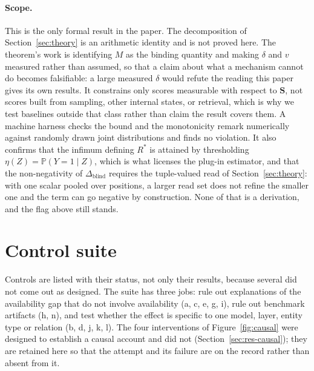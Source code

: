 \documentclass{article}
\newcommand{\gate}{\mathbf{S}}
\begin{document}
\paragraph{Scope.} This is the only formal result in the paper. The decomposition of
Section~\ref{sec:theory} is an arithmetic identity and is not proved here. The theorem's work is
identifying $M$ as the binding quantity and making $\delta$ and $v$ measured rather than assumed, so
that a claim about what a mechanism cannot do becomes falsifiable: a large measured $\delta$ would
refute the reading this paper gives its own results. It constrains only scores measurable with respect
to $\gate$, not scores built from sampling, other internal states, or retrieval, which is why we test
baselines outside that class rather than claim the result covers them. A machine harness checks the
bound and the monotonicity remark numerically against randomly drawn joint distributions and finds no
violation. It also confirms that the infimum defining $R^\ast$ is attained by thresholding
$\eta(Z)=\mathbb{P}(Y=1\mid Z)$, which is what licenses the plug-in estimator, and that the
non-negativity of $\Delta_{\mathrm{blind}}$ requires the tuple-valued read of
Section~\ref{sec:theory}: with one scalar pooled over positions, a larger read set does not refine the
smaller one and the term can go negative by construction. None of that is a derivation, and the flag
above still stands.


\section{Control suite}
\label{app:controls}

Controls are listed with their status, not only their results, because several did not come out as
designed. The suite has three jobs: rule out explanations of the availability gap that do not involve
availability (a, c, e, g, i), rule out benchmark artifacts (h, n), and test whether the effect is
specific to one model, layer, entity type or relation (b, d, j, k, l). The four interventions of
Figure~\ref{fig:causal} were designed to establish a causal account and did not
(Section~\ref{sec:res-causal}); they are retained here so that the attempt and its failure are on the
record rather than absent from it.
\end{document}
